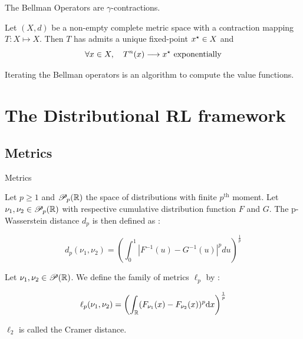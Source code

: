 \documentclass[10pt]{beamer}
\begin{document}
\begin{frame}
    \begin{proposition}
        The Bellman Operators are $\gamma$-contractions.
    \end{proposition}

    \begin{theorem}
        Let $( X , d )$ be a non-empty complete metric space with a contraction mapping $ T : X \mapsto X$. Then $T$ has admits a unique fixed-point $x^{\star}\in X$ and
        \[ \forall x \in X, \quad T^n(x) \longrightarrow x^{\star} \text{ exponentially} \]
    \end{theorem}

    \begin{corollary}[Algorithms]
        Iterating the Bellman operators is an algorithm to compute the value functions.
    \end{corollary}
\end{frame}
































\section{The Distributional RL framework}


\subsection*{Metrics}
\begin{frame}{Metrics}
    \begin{definition}
        Let $p \geq 1$ and $\mathscr{P}_p(\mathbb{R})$ the space of distributions with finite $p^{\text{th}}$ moment. Let $\nu_1, \nu_2 \in \mathscr{P}_p(\mathbb{R})$  with respective cumulative distribution function $F$ and $G$. The p-Wasserstein distance $d_p$ is then defined as :
    
        \[ d_p(\nu_1, \nu_2) = \left(\int_0^1\left|F^{-1}(u) - G^{-1}(u)\right|^p du\right)^{\frac{1}{p}} \]
    \end{definition}
    \begin{definition}
        Let $\nu_1, \nu_2 \in \mathscr{P}(\mathbb{R})$. We define the family of metrics $\ell_p$ by :
    
        \[ \ell_p(\nu_1, \nu_2) = \left( \int_{\mathbb{R}} (F_{\nu_1}(x) - F_{\nu_2}(x))^p \mathrm{d} x\right)^{\frac{1}{p}} \]
    
        $\ell_2$ is called the Cramer distance.
    \end{definition}
\end{frame}
\end{document}
